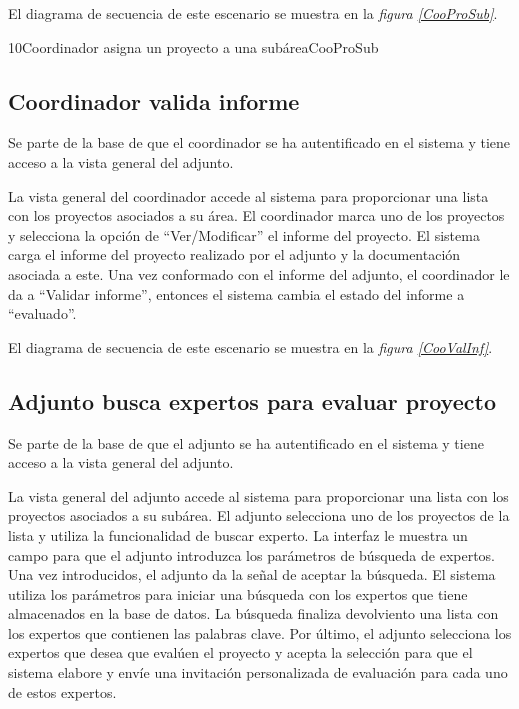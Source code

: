 \documentclass[11pt,a4paper,spanish,twoside]{book}
\begin{document}
El diagrama de secuencia de este escenario se muestra en la \emph{figura
\ref{CooProSub}}.

{10}{Coordinador asigna un proyecto a una subárea}{CooProSub}

\subsection{Coordinador valida informe}
Se parte de la base de que el coordinador se ha autentificado en el sistema y
tiene acceso a la vista general del adjunto.

La vista general del coordinador accede al sistema para proporcionar una
lista con los proyectos asociados a su área. El coordinador marca uno
de los proyectos y selecciona la opción de ``Ver/Modificar'' el informe del
proyecto. El sistema carga el informe del proyecto realizado por el adjunto
y la documentación asociada a este. Una vez conformado con el informe del
adjunto, el coordinador le da a ``Validar informe'', entonces el sistema
cambia el estado del informe a ``evaluado''.

El diagrama de secuencia de este escenario se muestra en la \emph{figura
\ref{CooValInf}}.


\subsection{Adjunto busca expertos para evaluar proyecto}
Se parte de la base de que el adjunto se ha autentificado en el sistema y
tiene acceso a la vista general del adjunto.

La vista general del adjunto accede al sistema para proporcionar una lista
con los proyectos asociados a su subárea. El adjunto selecciona uno de los
proyectos de la lista y utiliza la funcionalidad de buscar experto. La 
interfaz le muestra un campo para que el adjunto introduzca los parámetros de
búsqueda de expertos. Una vez introducidos, el adjunto da la señal de
aceptar la búsqueda. El sistema utiliza los parámetros para iniciar una 
búsqueda con los expertos que tiene almacenados en la base de datos. La
búsqueda finaliza devolviento una lista con los expertos que contienen las
palabras clave. Por último, el adjunto selecciona los expertos que desea que
evalúen el proyecto y acepta la selección para que el sistema elabore y
envíe una invitación personalizada de evaluación para cada uno de estos
expertos.
\end{document}
